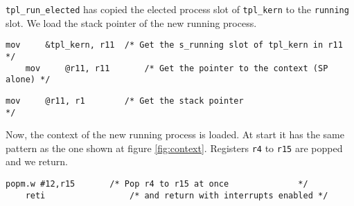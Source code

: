 \documentclass[11pt, oneside]{article}   	%
\begin{document}
\lstinline{tpl_run_elected} has copied the elected process slot of \lstinline{tpl_kern} to the \lstinline{running} slot. We load the stack pointer of the new running process.

\begin{lstlisting}[backgroundcolor=\color{red!15}]
    mov     &tpl_kern, r11  /* Get the s_running slot of tpl_kern in r11 */
    mov     @r11, r11       /* Get the pointer to the context (SP alone) */
\end{lstlisting}
\begin{lstlisting}[backgroundcolor=\color{yellow!15}]
    mov     @r11, r1        /* Get the stack pointer                     */
\end{lstlisting}

Now, the context of the new running process is loaded. At start it has the same pattern as the one shown at figure \ref{fig:context}. Registers \lstinline{r4} to \lstinline{r15} are popped and we return.

\begin{lstlisting}[backgroundcolor=\color{yellow!15}]
    popm.w #12,r15       /* Pop r4 to r15 at once              */
    reti                 /* and return with interrupts enabled */
\end{lstlisting}
\end{document}
